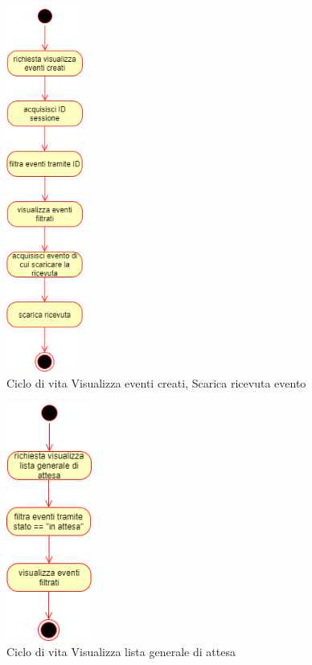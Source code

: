 \documentclass[11pt]{article}
\begin{document}
\begin{figure}[H]
\centering
\includegraphics[width=0.225\textwidth]{Ciclo di vita Visualizza eventi creati, Scarica ricevuta evento.png}
\caption{Ciclo di vita Visualizza eventi creati, Scarica ricevuta evento}
\end{figure}

\begin{figure}[H]
\centering
\includegraphics[width=0.25\textwidth]{Ciclo di vita Visualizza lista generale di attesa.png}
\caption{Ciclo di vita Visualizza lista generale di attesa}
\end{figure}
\end{document}
